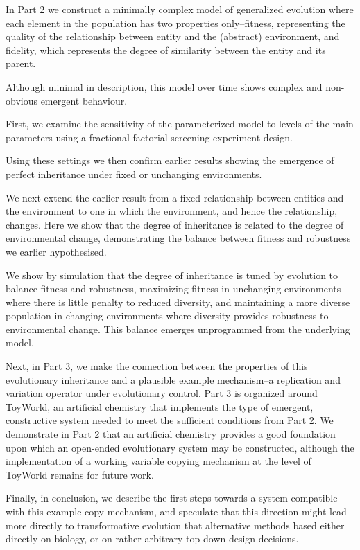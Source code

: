 \documentclass[]{report}
\begin{document}
In Part 2 we construct a minimally complex model of generalized evolution where each element in the population has two properties only--fitness, representing the quality of the relationship between entity and the (abstract) environment, and fidelity, which represents the degree of similarity between the entity and its parent.

Although minimal in description, this model over time shows complex and non-obvious emergent behaviour.

First, we examine the sensitivity of the parameterized model to levels of the main parameters using a fractional-factorial screening experiment design.

Using these settings we then confirm earlier results showing the emergence of perfect inheritance under fixed or unchanging environments.

We next extend the earlier result from a fixed relationship between entities and the environment to one in which the environment, and hence the relationship, changes. Here we show that the degree of inheritance is related to the degree of environmental change, demonstrating the balance between fitness and robustness we earlier hypothesised.

We show by simulation that the degree of inheritance is tuned by evolution to balance fitness and robustness, maximizing fitness in unchanging environments where there is little penalty to reduced diversity, and maintaining a more diverse population in changing environments where diversity provides robustness to environmental change. This balance emerges unprogrammed from the underlying model.

Next, in Part 3, we make the connection between the properties of this evolutionary inheritance and a plausible example mechanism--a replication and variation operator under evolutionary control. Part 3 is organized around ToyWorld, an artificial chemistry that implements the type of emergent, constructive system needed to meet the sufficient conditions from Part 2. We demonstrate in Part 2 that an artificial chemistry provides a good foundation upon which an open-ended evolutionary system may be constructed, although the implementation of a working variable copying mechanism at the level of ToyWorld remains for future work.

Finally, in conclusion, we describe the first steps towards a system compatible with this example copy mechanism, and speculate that this direction might lead more directly to transformative evolution that alternative methods based either directly on biology, or on rather arbitrary top-down design decisions.
\end{document}
